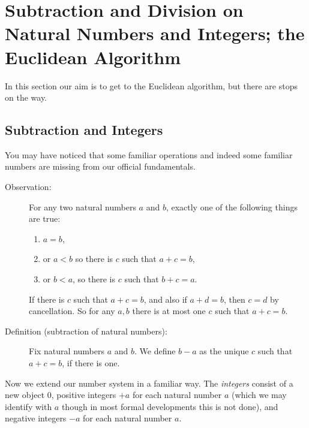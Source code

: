 \documentclass[12pt]{article}
\begin{document}
\section{Subtraction and Division on Natural Numbers and Integers; the Euclidean Algorithm}

In this section our aim is to get to the Euclidean algorithm, but there are stops on the way.

\subsection{Subtraction and Integers}

You may have noticed that some familiar operations and indeed some familiar numbers are missing from our official fundamentals.

\begin{description}

\item[Observation:]   For any two natural numbers $a$ and $b$, exactly one of the following things are true:

\begin{enumerate}

\item $a=b$, 

\item or $a<b$ so there is $c$ such that $a+c=b$, 

\item or $b<a$, so there is $c$ such that $b+c=a$.

\end{enumerate}


If there is $c$ such that $a+c=b$, and also if $a+d=b$, then $c=d$ by cancellation.   So for any $a,b$ there is at most one $c$ such that $a+c=b$.

\item[Definition (subtraction of natural numbers):]  Fix natural numbers $a$ and $b$.   We define $b-a$ as the unique $c$ such that $a+c=b$, if there is one.

\end{description}

Now we extend our number system in a familiar way.  The {\em integers} consist of a new object 0,
positive integers $+a$ for each natural number $a$ (which we may identify with $a$ though in most formal developments this is not done), and negative integers $-a$ for each natural number $a$.
\end{document}
